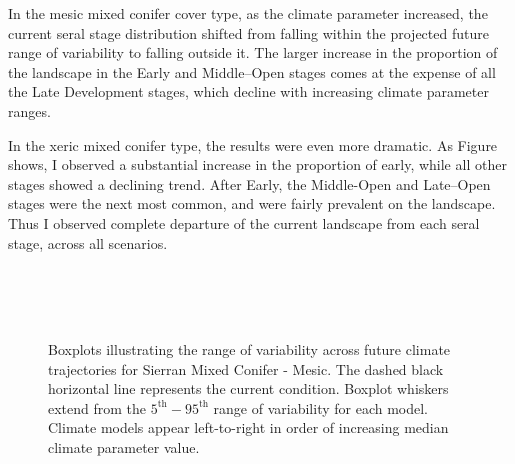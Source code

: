 In the mesic mixed conifer cover type, as the climate parameter increased, the current seral stage distribution shifted from falling within the projected future range of variability to falling outside it. The larger increase in the proportion of the landscape in the Early and Middle--Open stages comes at the expense of all the Late Development stages, which decline with increasing climate parameter ranges.

In the xeric mixed conifer type, the results were even more dramatic. As Figure~ shows, I observed a substantial increase in the proportion of early, while all other stages showed a declining trend. After Early, the Middle-Open and Late--Open stages were the next most common, and were fairly prevalent on the landscape. Thus I observed complete departure of the current landscape from each seral stage, across all scenarios.

\begin{figure}[htbp]
 \captionsetup[subfigure]{labelformat=empty}
  \centering
   \\
   \\
     \\
  \caption{Boxplots illustrating the range of variability across future climate trajectories for Sierran Mixed Conifer - Mesic. The dashed black horizontal line represents the current condition. Boxplot whiskers extend from the $5^{\text{th}} - 95^{\text{th}}$ range of variability for each model. Climate models appear left-to-right in order of increasing median climate parameter value.}
  \label{fig:covcond_smcm}
\end{figure} %

